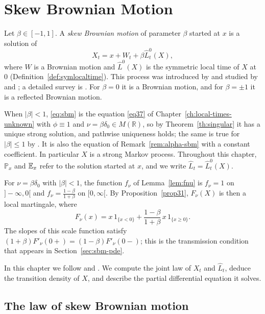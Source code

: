 \chapter{Skew Brownian Motion}\label{ch:sbm}

Let $\beta\in[-1,1]$. A \emph{skew Brownian motion} of parameter $\beta$
started at $x$ is a solution of
\begin{equation}\label{eq:sbm}
	X_t = x + W_t + \beta\hat{L}^0_t(X),
\end{equation}
where $W$ is a Brownian motion and $\hat{L}^0(X)$ is the symmetric local time
of $X$ at $0$ (Definition~\ref{def:symlocaltime}). This process was introduced
by \citet{ItoMcKean1965} and studied by \citet{Walsh1978} and
\citet{HarrisonShepp1981}; a detailed survey is \citet{Lejay2006}. For
$\beta = 0$ it is a Brownian motion, and for $\beta = \pm1$ it is a reflected
Brownian motion.

When $|\beta|<1$, \eqref{eq:sbm} is the equation \eqref{eq37} of
Chapter~\ref{ch:local-times-unknown} with $\phi\equiv1$ and
$\nu = \beta\delta_0\in M(\mathbb{R})$, so by Theorem~\ref{th:singular} it has a
unique strong solution, and pathwise uniqueness holds; the same is true for
$|\beta|\leqslant1$ by \citet{HarrisonShepp1981}. It is also the equation of
Remark~\ref{rem:alpha-sbm} with a constant coefficient. In particular $X$ is a
strong Markov process. Throughout this chapter, $\mathbb{P}_x$ and $\mathbb{E}_x$
refer to the solution started at $x$, and we write $\hat{L}_t = \hat{L}^0_t(X)$.

\begin{remark}\label{rem:sbm-scale}
	For $\nu = \beta\delta_0$ with $|\beta|<1$, the function $f_\nu$ of
	Lemma~\ref{lem:fnu} is $f_\nu = 1$ on $]-\infty,0[$ and
	$f_\nu = \frac{1-\beta}{1+\beta}$ on $[0,\infty[$. By
	Proposition~\ref{prop31}, $F_\nu(X)$ is then a local martingale, where
	\[
		F_\nu(x) = x\,1_{\{x<0\}} + \frac{1-\beta}{1+\beta}\,x\,1_{\{x\geqslant0\}} .
	\]
	The slopes of this scale function satisfy
	$(1+\beta)F'_\nu(0+) = (1-\beta)F'_\nu(0-)$; this is the transmission
	condition that appears in Section~\ref{sec:sbm-pde}.
\end{remark}

In this chapter we follow \citet{Lejay2006} and \citet{EtoreMartinez2012}. We
compute the joint law of $X_t$ and $\hat{L}_t$, deduce the transition density
of $X$, and describe the partial differential equation it solves.

\section{The law of skew Brownian motion}

